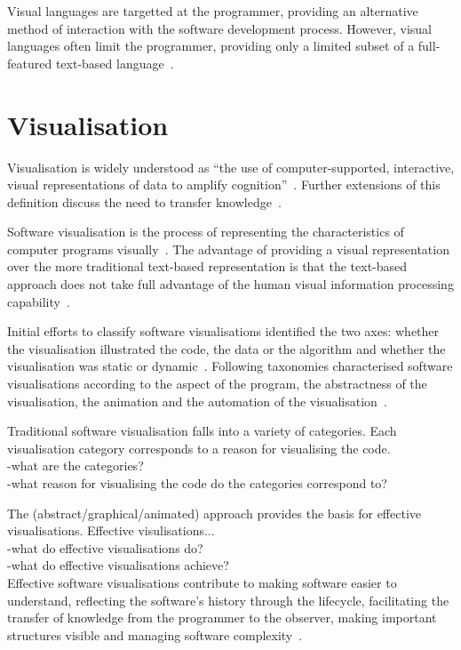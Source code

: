 Visual languages are targetted at the programmer, providing an alternative method of interaction with the software development process. However, visual languages often limit the programmer, providing only a limited subset of a full-featured text-based language~.

\section{Visualisation}

Visualisation is widely understood as ``the use of computer-supported, interactive, visual representations of data to amplify cognition''~\cite{Card1999}. Further extensions of this definition discuss the need to transfer knowledge~\cite{Burkhard}.

Software visualisation is the process of representing the characteristics of computer programs visually~\cite{Stasko1992}. The advantage of providing a visual representation over the more traditional text-based representation is that the text-based approach does not take full advantage of the human visual information processing capability~\cite{Myers1989}.

Initial efforts to classify software visualisations identified the two axes: whether the visualisation illustrated the code, the data or the algorithm and whether the visualisation was static or dynamic~\cite{Myers1989}. Following taxonomies characterised software visualisations according to the aspect of the program, the abstractness of the visualisation, the animation and the automation of the visualisation~\cite{Stasko1992}.

Traditional software visualisation falls into a variety of categories. Each visualisation category corresponds to a reason for visualising the code.\\
-what are the categories?\\
-what reason for visualising the code do the categories correspond to?

The (abstract/graphical/animated) approach provides the basis for effective visualisations. Effective visulisations...\\
-what do effective visualisations do?\\
-what do effective visualisations achieve?\\
Effective software visualisations contribute to making software easier to understand, reflecting the software's history through the lifecycle, facilitating the transfer of knowledge from the programmer to the observer, making important structures visible and managing software complexity~\cite{Baecker1995}.

